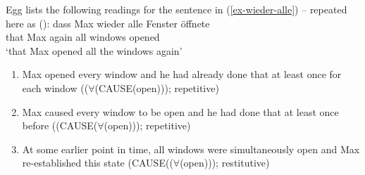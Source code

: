 Egg lists the following readings for the sentence in (\ref{ex-wieder-alle}) -- repeated here as ():
\ea
\label{ex-wieder-alle-zwei}
\gll dass Max wieder alle Fenster öffnete\\
	 that Max again all windows opened\\
\glt `that Max opened all the windows again'
\z
\begin{enumerate}
\item Max opened every window and he had already done that at least once for each window
      (($\forall$(CAUSE(open))); repetitive)
\item Max caused every window to be open and he had done that at least once before 
      ((CAUSE($\forall$(open))); repetitive)
\item At some earlier point in time, all windows were simultaneously open and Max re-established this state
      (CAUSE(($\forall$(open))); restitutive)
\end{enumerate}

